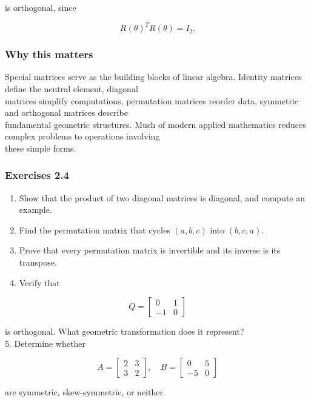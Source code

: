 \documentclass[
  12pt,
  a4paper,
]{article}
\begin{document}
is orthogonal, since

\[R(\theta)^T R(\theta) = I_2.\]

\subsubsection{Why this matters}\label{why-this-matters-7}

Special matrices serve as the building blocks of linear algebra.
Identity matrices define the neutral element, diagonal\\
matrices simplify computations, permutation matrices reorder data,
symmetric and orthogonal matrices describe\\
fundamental geometric structures. Much of modern applied mathematics
reduces complex problems to operations involving\\
these simple forms.

\subsubsection{Exercises 2.4}\label{exercises-24}

\begin{enumerate}
\def\labelenumi{\arabic{enumi}.}
\item
  Show that the product of two diagonal matrices is diagonal, and
  compute an example.
\item
  Find the permutation matrix that cycles \((a,b,c)\) into \((b,c,a)\).
\item
  Prove that every permutation matrix is invertible and its inverse is
  its transpose.
\item
  Verify that
\end{enumerate}

\[Q = \begin{bmatrix}
0 & 1 \\
-1 & 0 \end{bmatrix}\]

is orthogonal. What geometric transformation does it represent?\\
5. Determine whether

\[A = \begin{bmatrix}
2 & 3 \\
3 & 2 \end{bmatrix}, \quad
B = \begin{bmatrix}
0 & 5 \\
-5 & 0 \end{bmatrix}\]

are symmetric, skew-symmetric, or neither.
\end{document}

